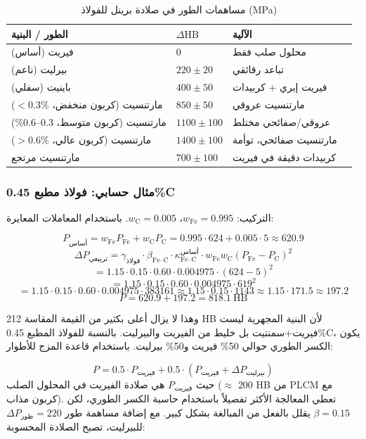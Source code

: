 \documentclass[12pt,a4paper]{article}
\begin{document}
	\begin{longtable}{p{3.5cm} p{3.0cm} p{3.0cm} p{4cm}}
		\caption{مساهمات الطور في صلادة برينل للفولاذ (MPa)}\label{tab:steel_phase_contrib}\\
		\toprule
		\textbf{الطور / البنية} & \(\Delta\text{HB}\) & \textbf{الآلية} \\
		\midrule
		فيريت (أساس) & 0 & محلول صلب فقط \\
		بيرليت (ناعم) & \(220 \pm 20\) & تباعد رقائقي \\
		باينيت (سفلي) & \(400 \pm 50\) & فيريت إبري + كربيدات \\
		مارتنسيت (كربون منخفض، \(<0.3\%\)) & \(850 \pm 50\) & مارتنسيت عروقي \\
		مارتنسيت (كربون متوسط، 0.3–0.6\%) & \(1100 \pm 100\) & عروقي/صفائحي مختلط \\
		مارتنسيت (كربون عالي، \(>0.6\%\)) & \(1400 \pm 100\) & مارتنسيت صفائحي، توأمة \\
		مارتنسيت مرتجع & \(700 \pm 100\) & كربيدات دقيقة في فيريت \\
		\bottomrule
	\end{longtable}
	
	\subsubsection{مثال حسابي: فولاذ مطبع 0.45\%C}
	
	التركيب: \(w_{\text{Fe}} = 0.995\)، \(w_{\text{C}} = 0.005\). باستخدام المعاملات المعايرة:
	
	\[
	P_{\text{أساس}} = w_{\text{Fe}} P_{\text{Fe}} + w_{\text{C}} P_{\text{C}} = 0.995\cdot624 + 0.005\cdot5 \approx 620.9
	\]
	\[
	\Delta P_{\text{تربيعي}} = \gamma_{\text{فولاذ}} \cdot \beta_{\text{Fe–C}} \cdot \kappa_{\text{Fe–C}}^{\text{أساس}} \cdot w_{\text{Fe}} w_{\text{C}} (P_{\text{Fe}}-P_{\text{C}})^2
	\]
	\[
	= 1.15 \cdot 0.15 \cdot 0.60 \cdot 0.004975 \cdot (624-5)^2
	\]
	\[
	= 1.15 \cdot 0.15 \cdot 0.60 \cdot 0.004975 \cdot 619^2
	\]
	\[
	= 1.15 \cdot 0.15 \cdot 0.60 \cdot 0.004975 \cdot 383161 \approx 1.15 \cdot 0.15 \cdot 1143 \approx 1.15 \cdot 171.5 \approx 197.2
	\]
	\[
	P = 620.9 + 197.2 = 818.1\ \text{HB}
	\]
	
	وهذا لا يزال أعلى بكثير من القيمة المقاسة 212 HB لأن البنية المجهرية ليست فيريت+سمنتيت بل خليط من الفيريت والبيرليت. بالنسبة للفولاذ المطبع 0.45\%C، يكون الكسر الطوري حوالي 50\% فيريت و50\% بيرليت. باستخدام قاعدة المزج للأطوار:
	
	\[
	P = 0.5 \cdot P_{\text{فيريت}} + 0.5 \cdot (P_{\text{فيريت}} + \Delta P_{\text{بيرليت}})
	\]
	حيث \(P_{\text{فيريت}}\) هي صلادة الفيريت في المحلول الصلب (\(\approx\) 200 HB من PLCM مع كربون مذاب). تعطي المعالجة الأكثر تفصيلاً باستخدام حاسبة الكسر الطوري، لكن \(\beta = 0.15\) يقلل بالفعل من المبالغة بشكل كبير. مع إضافة مساهمة طور \(\Delta P_{\text{طور}} = 220\) للبيرليت، تصبح الصلادة المحسوبة:
	
\end{document}
